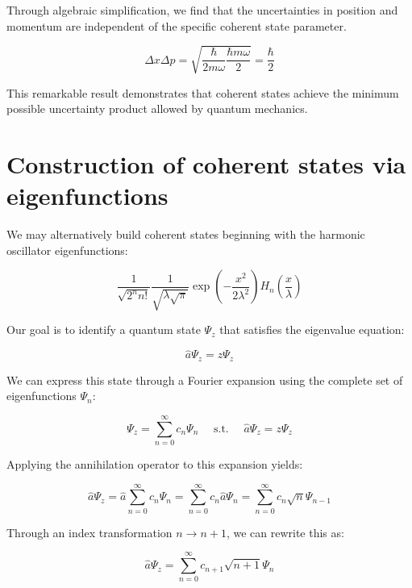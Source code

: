 Through algebraic simplification, we find that the uncertainties in position and momentum are independent of the specific coherent state parameter.

\begin{equation}
\Delta x \Delta p=\sqrt{\frac{\hbar}{2 m \omega} \frac{\hbar m \omega}{2}}=\frac{\hbar}{2}
\end{equation}

This remarkable result demonstrates that coherent states achieve the minimum possible uncertainty product allowed by quantum mechanics.

\section{Construction of coherent states via eigenfunctions}
We may alternatively build coherent states beginning with the harmonic oscillator eigenfunctions:

\begin{equation}
\frac{1}{\sqrt{2^{n} n!}} \frac{1}{\sqrt{\lambda \sqrt{\pi}}} \exp \left(-\frac{x^{2}}{2 \lambda^{2}}\right) H_{n}\left(\frac{x}{\lambda}\right)
\end{equation}

Our goal is to identify a quantum state $\Psi_{z}$ that satisfies the eigenvalue equation:

\begin{equation}
\hat{a} \Psi_{z}=z \Psi_{z}
\end{equation}

We can express this state through a Fourier expansion using the complete set of eigenfunctions $\Psi_{n}$:

\begin{equation}
\Psi_{z}=\sum_{n=0}^{\infty} c_{n} \Psi_{n} \quad \text { s.t. } \quad \hat{a} \Psi_{z}=z \Psi_{z}
\end{equation}

Applying the annihilation operator to this expansion yields:

\begin{equation}
\hat{a} \Psi_{z}=\hat{a} \sum_{n=0}^{\infty} c_{n} \Psi_{n}=\sum_{n=0}^{\infty} c_{n} \hat{a} \Psi_{n}=\sum_{n=0}^{\infty} c_{n} \sqrt{n} \Psi_{n-1}
\end{equation}

Through an index transformation $n \rightarrow n+1$, we can rewrite this as:

\begin{equation}
\hat{a} \Psi_{z}=\sum_{n=0}^{\infty} c_{n+1} \sqrt{n+1} \Psi_{n}
\end{equation}

